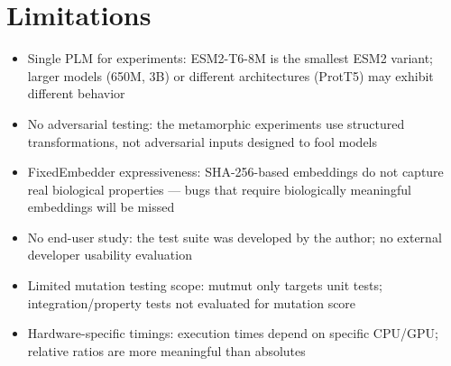 \section{Limitations}\label{sec:limitations}
\begin{itemize}
  \item Single PLM for experiments: ESM2-T6-8M is the smallest ESM2 variant; larger models (650M, 3B) or different architectures (ProtT5) may exhibit different behavior
  \item No adversarial testing: the metamorphic experiments use structured transformations, not adversarial inputs designed to fool models
  \item FixedEmbedder expressiveness: SHA-256-based embeddings do not capture real biological properties --- bugs that require biologically meaningful embeddings will be missed
  \item No end-user study: the test suite was developed by the author; no external developer usability evaluation
  \item Limited mutation testing scope: mutmut only targets unit tests; integration/property tests not evaluated for mutation score
  \item Hardware-specific timings: execution times depend on specific CPU/GPU; relative ratios are more meaningful than absolutes
\end{itemize}

